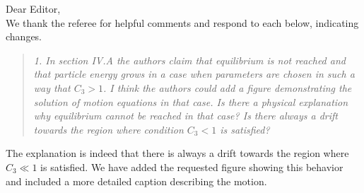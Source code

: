 \documentclass{article}
\begin{document}
Dear Editor, \\

We thank the referee for helpful comments and respond to each below, indicating changes.

\begin{quote}\textit{
1. In section IV.A the authors claim that equilibrium is not reached
and that particle energy grows in a case when parameters are chosen in
such a way that $C_3 > 1$. I think the authors could add a figure
demonstrating the solution of motion equations in that case. Is there
a physical explanation why equilibrium cannot be reached in that case?
Is there always a drift towards the region where condition $C_3 < 1$
is satisfied?}\end{quote}

The explanation is indeed that there is always a drift towards the region where $C_3 \ll 1$ is satisfied.  We have added the requested figure showing this behavior and included a more detailed caption describing the motion.
\end{document}
